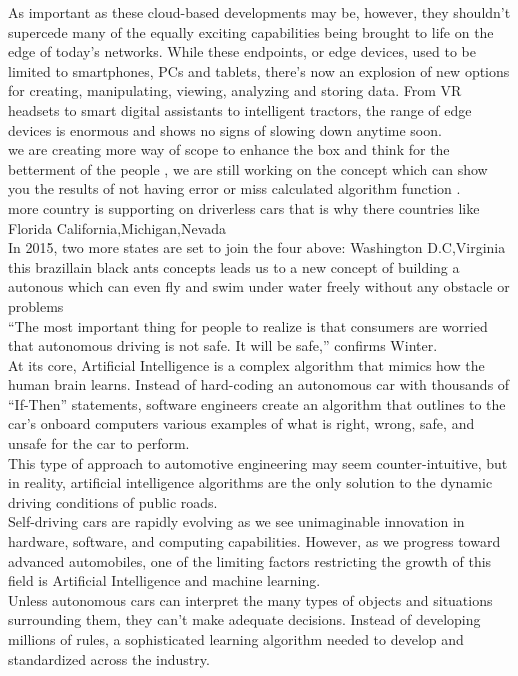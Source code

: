 \documentclass[conference]{IEEEtran}
\begin{document}
As important as these cloud-based developments may be, however, they shouldn’t supercede many of the equally exciting capabilities being brought to life on the edge of today’s networks. While these endpoints, or edge devices, used to be limited to smartphones, PCs and tablets, there’s now an explosion of new options for creating, manipulating, viewing, analyzing and storing data. From VR headsets to smart digital assistants to intelligent tractors, the range of edge devices is enormous and shows no signs of slowing down anytime soon.\\
we are creating more way of scope to enhance the box and think for the betterment of the people , we are still working on the concept which can show you the results of not having error or miss calculated algorithm function .\\
more country is supporting on driverless cars that is why there countries like Florida
California,Michigan,Nevada\\
In 2015, two more states are set to join the four above:
Washington D.C,Virginia\\
this brazillain black ants concepts leads us to a new concept of building a autonous which can even fly and swim under water freely without any obstacle or problems\\
“The most important thing for people to realize is that consumers are worried that autonomous driving is not safe. It will be safe,” confirms Winter.\\
At its core, Artificial Intelligence is a complex algorithm that mimics how the human brain learns. Instead of hard-coding an autonomous car with thousands of “If-Then” statements, software engineers create an algorithm that outlines to the car’s onboard computers various examples of what is right, wrong, safe, and unsafe for the car to perform.\\

This type of approach to automotive engineering may seem counter-intuitive, but in reality, artificial intelligence algorithms are the only solution to the dynamic driving conditions of public roads.\\
Self-driving cars are rapidly evolving as we see unimaginable innovation in hardware, software, and computing capabilities. However, as we progress toward advanced automobiles, one of the limiting factors restricting the growth of this field is Artificial Intelligence and machine learning.\\

Unless autonomous cars can interpret the many types of objects and situations surrounding them, they can’t make adequate decisions. Instead of developing millions of rules, a sophisticated learning algorithm needed to develop and standardized across the industry.\\
\end{document}
